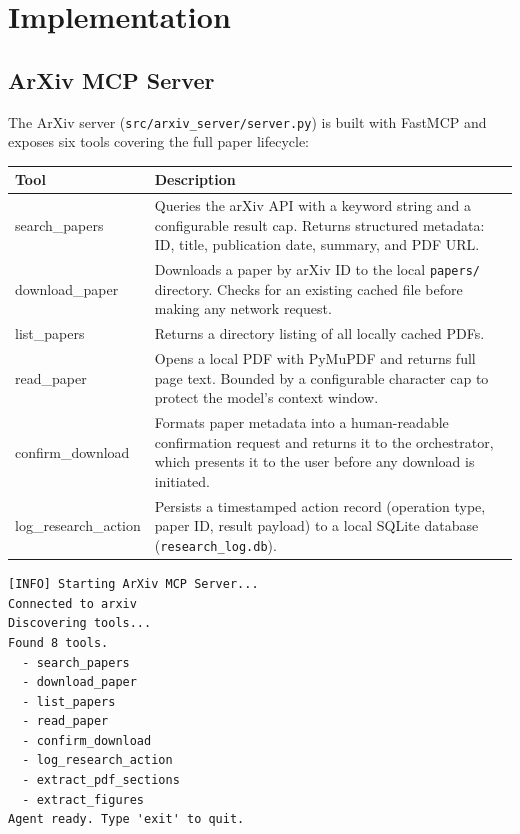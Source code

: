 \documentclass[12pt, a4paper]{article}
\newcommand{\code}[1]{\texttt{\small\color{darwinblue}#1}}
\begin{document}
\section{Implementation}

\subsection{ArXiv MCP Server}

The ArXiv server (\code{src/arxiv\_server/server.py}) is built with FastMCP and exposes six tools covering the full paper lifecycle:

\begin{center}
\begin{tabular}{>{\ttfamily\small}l p{9cm}}
    \toprule
    \normalfont\textbf{Tool} & \textbf{Description} \\
    \midrule
    search\_papers       & Queries the arXiv API with a keyword string and a configurable result cap. Returns structured metadata: ID, title, publication date, summary, and PDF URL. \\[4pt]
    download\_paper      & Downloads a paper by arXiv ID to the local \code{papers/} directory. Checks for an existing cached file before making any network request. \\[4pt]
    list\_papers         & Returns a directory listing of all locally cached PDFs. \\[4pt]
    read\_paper          & Opens a local PDF with PyMuPDF and returns full page text. Bounded by a configurable character cap to protect the model's context window. \\[4pt]
    confirm\_download    & Formats paper metadata into a human-readable confirmation request and returns it to the orchestrator, which presents it to the user before any download is initiated. \\[4pt]
    log\_research\_action & Persists a timestamped action record (operation type, paper ID, result payload) to a local SQLite database (\code{research\_log.db}). \\
    \bottomrule
\end{tabular}
\end{center}

\begin{lstlisting}[style=terminal, caption={ArXiv MCP server startup and tool discovery}]
[INFO] Starting ArXiv MCP Server...
Connected to arxiv
Discovering tools...
Found 8 tools.
  - search_papers
  - download_paper
  - list_papers
  - read_paper
  - confirm_download
  - log_research_action
  - extract_pdf_sections
  - extract_figures
Agent ready. Type 'exit' to quit.
\end{lstlisting}
\end{document}
